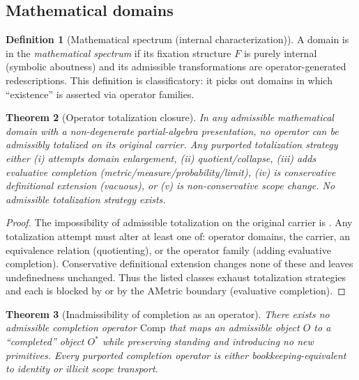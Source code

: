 \documentclass[11pt]{article}
\newtheorem{theorem}{Theorem}[section]
\theoremstyle{definition}
\newtheorem{definition}[theorem]{Definition}
\begin{document}
\subsection{Mathematical domains}

\begin{definition}[Mathematical spectrum (internal characterization)]
A domain is in the \emph{mathematical spectrum} if its fixation structure $F$ is purely internal (symbolic aboutness) and its admissible transformations are operator-generated redescriptions.
This definition is classificatory: it picks out domains in which ``existence'' is asserted via operator families.
\end{definition}

\begin{theorem}[Operator totalization closure]
\label{thm:math-totalization-closure}
In any admissible mathematical domain with a non-degenerate partial-algebra presentation, no operator can be admissibly totalized on its original carrier.
Any purported totalization strategy either (i) attempts domain enlargement, (ii) quotient/collapse, (iii) adds evaluative completion (metric/measure/probability/limit), (iv) is conservative definitional extension (vacuous), or (v) is non-conservative scope change.
No admissible totalization strategy exists.
\end{theorem}

\begin{proof}
The impossibility of admissible totalization on the original carrier is .
Any totalization attempt must alter at least one of: operator domains, the carrier, an equivalence relation (quotienting), or the operator family (adding evaluative completion). Conservative definitional extension changes none of these and leaves undefinedness unchanged.
Thus the listed classes exhaust totalization strategies and each is blocked by  or by the AMetric boundary (evaluative completion).
\end{proof}

\begin{theorem}[Inadmissibility of completion as an operator]
\label{thm:no-completion-operator}
There exists no admissible completion operator $\mathrm{Comp}$ that maps an admissible object $O$ to a ``completed'' object $O^*$ while preserving standing and introducing no new primitives.
Every purported completion operator is either bookkeeping-equivalent to identity or illicit scope transport.
\end{theorem}
\end{document}
